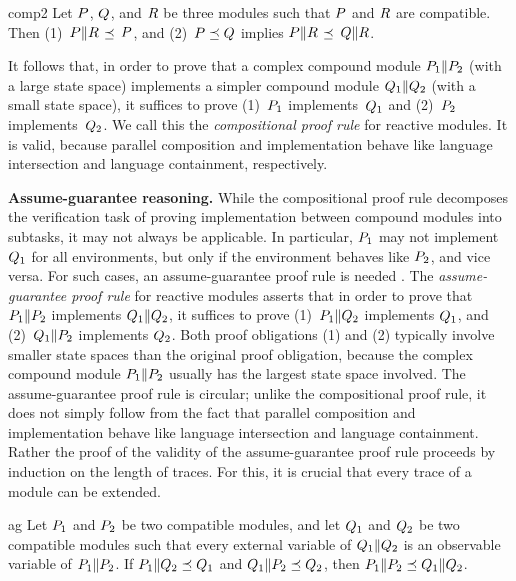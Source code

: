 \begin{proposition}{comp2}
  Let ${P}$, ${Q}$, and ${R}$ be three modules such that ${P}$ and ${R}$
  are compatible.
  Then
  {\rm (1)}~${P}\|{R}$ $\preceq$ ${P}$, and
  {\rm (2)}~${P}\preceq{Q}$ implies ${P}\|{R}$ $\preceq$ ${Q}\|{R}$.
\end{proposition}

\mypar
It follows that, in order to prove that a complex compound module
${P}_1\|{P}_2$ (with a large state space) implements a simpler compound
module ${Q}_1\|{Q}_2$ (with a small state space), it suffices to prove
(1)~${P}_1$ implements~${Q}_1$ and
(2)~${P}_2$ implements~${Q}_2$.
We call this the {\em compositional proof rule\/} for reactive modules.
It is valid, because parallel composition and implementation behave like
language intersection and language containment, respectively.

\mypar
{\bf Assume-guarantee reasoning.}
While the compositional proof rule decomposes the verification task of
proving implementation between compound modules into subtasks, it may not
always be applicable.
In particular, ${P}_1$ may not implement ${Q}_1$ for all environments, but
only if the environment behaves like ${P}_2$, and vice versa.
For such cases, an assume-guarantee proof rule is needed
\cite{Stark,AbadiLamport,GrumbergLong94,Reactive95}.
The {\em assume-guarantee proof rule\/} for reactive modules asserts that in
order to prove that ${P}_1\|{P}_2$ implements ${Q}_1\|{Q}_2$, it suffices
to prove
(1)~${P}_1\|{Q}_2$ implements ${Q}_1$, and
(2)~${Q}_1\|{P}_2$ implements ${Q}_2$.
Both proof obligations (1) and (2) typically involve smaller state spaces
than the original proof obligation, because the complex compound module
${P}_1\|{P}_2$ usually has the largest state space involved.
The assume-guarantee proof rule is circular;
unlike the compositional proof rule, it does not simply follow from the
fact that parallel composition and implementation behave like language
intersection and language containment.
Rather the proof of the validity of the assume-guarantee proof rule proceeds
by induction on the length of traces.
For this, it is crucial that every trace of a module can be extended.

\begin{proposition}{ag}
  Let ${P}_1$ and ${P}_2$ be two compatible modules, and let ${Q}_1$ and
  ${Q}_2$ be two compatible modules such that every external variable of
  ${Q}_1\|{Q}_2$ is an observable variable of ${P}_1\|{P}_2$.
  If ${P}_1\|{Q}_2\preceq{Q}_1$ and ${Q}_1\|{P}_2\preceq{Q}_2$, then
  ${P}_1\|{P}_2\preceq{Q}_1\|{Q}_2$.
\end{proposition}


